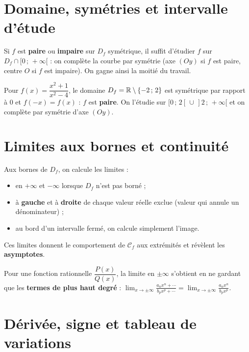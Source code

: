 \section{Domaine, symétries et intervalle d'étude}

\begin{aretenir}
Si $f$ est \textbf{paire} ou \textbf{impaire} sur $D_f$ symétrique, il suffit d'étudier
$f$ sur $D_f\cap[0\,;\,+\infty[$ : on complète la courbe par symétrie (axe $(Oy)$ si $f$
est paire, centre $O$ si $f$ est impaire). On gagne ainsi la moitié du travail.
\end{aretenir}

\begin{exemple}
Pour $f(x)=\dfrac{x^2+1}{x^2-4}$, le domaine $D_f=\mathbb{R}\setminus\{-2\,;\,2\}$ est symétrique
par rapport à $0$ et $f(-x)=f(x)$ : $f$ est \textbf{paire}. On l'étudie sur
$[0\,;\,2[\,\cup\,]2\,;\,+\infty[$ et on complète par symétrie d'axe $(Oy)$.
\end{exemple}

\section{Limites aux bornes et continuité}

\begin{aretenir}
Aux bornes de $D_f$, on calcule les limites :
\begin{itemize}
  \item en $+\infty$ et $-\infty$ lorsque $D_f$ n'est pas borné ;
  \item à \textbf{gauche} et à \textbf{droite} de chaque valeur réelle exclue (valeur
        qui annule un dénominateur) ;
  \item au bord d'un intervalle fermé, on calcule simplement l'image.
\end{itemize}
Ces limites donnent le comportement de $\mathcal{C}_f$ aux extrémités et révèlent les
\textbf{asymptotes}.
\end{aretenir}

\begin{remarque}
Pour une fonction rationnelle $\dfrac{P(x)}{Q(x)}$, la limite en $\pm\infty$ s'obtient en
ne gardant que les \textbf{termes de plus haut degré} : $\displaystyle\lim_{x\to\pm\infty}
\frac{a_nx^n+\cdots}{b_px^p+\cdots}=\lim_{x\to\pm\infty}\frac{a_nx^n}{b_px^p}$.
\end{remarque}

\section{Dérivée, signe et tableau de variations}

